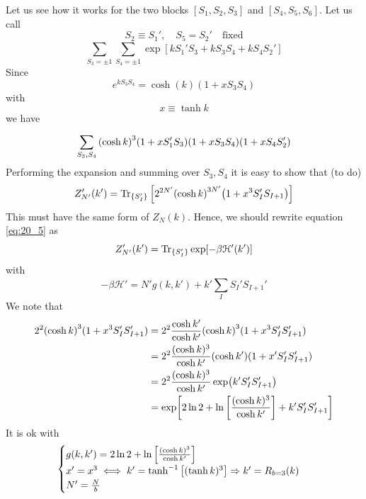 \documentclass[../main/main.tex]{subfiles}
\begin{document}
Let us see how it works for the two blocks \( [S_1,S_2,S_3] \) and \( [S_4,S_5,S_6] \). Let us call
\begin{equation}
  S_2 \equiv S_1', \quad S_5 = S_2' \quad \text{fixed}
\end{equation}
\begin{equation}
  \sum_{S_3 = \pm 1}^{}   \sum_{S_4 = \pm 1}^{}  \exp [ k S_1' S_3 + k S_3 S_4 + k S_4 S_2']
\end{equation}
Since
\begin{equation}
  e^{k S_3 S_4}  = \cosh (k) ( 1 + x S_3 S_4)
\end{equation}
with
\begin{equation}
  x \equiv \tanh k
\end{equation}
we have
\begin{equation}
  \sum_{S_3,S_4}^{} \qty(\cosh k)^3 \qty(1 + x S_1' S_3) \qty(1 + x S_3 S_4) \qty(1 + x S_4 S_2')
\end{equation}
Performing the expansion and summing over \( S_3, S_4 \)  it is easy to show that (to do)
\begin{equation}
  Z_{N'}' (k') = \Tr_{ \{ S_I' \}  } \qty[ 2 ^{2N'} \qty( \cosh k)^{3N'} \qty(1 + x^3 S_I' S_{I+1} )  ]
  \label{eq:20_5}
\end{equation}
This must have the same form of \( Z_N (k) \). Hence, we should rewrite equation \eqref{eq:20_5} as
\begin{equation}
  Z_{N'}' (k') = \Tr_{ \{ S_I' \}  } \exp [ - \beta \mathcal{H}' (k')]
\end{equation}
with
\begin{equation}
  - \beta \mathcal{H}' = N' g (k,k') + k' \sum_{I}^{} S_I' S_{I+1}'
\end{equation}
We note that
\begin{equation}
\begin{split}
2^2 \qty(\cosh k)^3 (1 + x^3 S_I' S_{I+1}')   &=  2^2 \frac{\cosh k'}{\cosh k'}
 \qty(\cosh k)^3  (1 + x^3 S_I' S_{I+1}') \\
 & = 2^2 \frac{(\cosh k)^3}{\cosh k'}
  \qty(\cosh k')  (1 + x' S_I' S_{I+1}') \\
  & = 2^2 \frac{(\cosh k)^3}{\cosh k'}
   \exp (k' S_I' S_{I+1}') \\
   & = \exp [ 2 \ln{2} + \ln{ \qty[ \frac{(\cosh k)^3}{\cosh k'}] }  + k' S_I' S_{I+1}' ]
\end{split}
\end{equation}
It is ok with
\begin{equation}
  \begin{cases}
   g(k,k') = 2 \ln{2} +  \ln{ \qty[ \frac{(\cosh k)^3}{\cosh k'}] } \\
   x' = x^3  \iff k'= \tanh^{-1} \qty[ (\tanh k)^3] \Rightarrow k' = R_{b=3} (k)\\
   N' = \frac{N}{b}
  \end{cases}
\end{equation}
\end{document}
